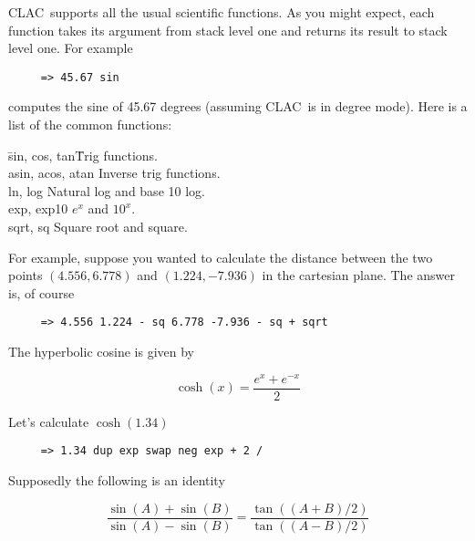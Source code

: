 \documentclass{report}
\newcommand{\CLAC}{CLAC}
\begin{document}
\CLAC\ supports all the usual scientific functions. As you might expect, each function takes its argument from stack level one and returns its result to stack level one. For example

\begin{verbatim}
     => 45.67 sin
\end{verbatim}

computes the sine of 45.67 degrees (assuming \CLAC\ is in degree mode). Here is a list of the common functions:

\begin{tabbing}

\hspace*{3em}\=sin, cos, tan\hspace{5em}\=Trig functions.\\
\>             asin, acos, atan\>         Inverse trig functions.\\
\>             ln, log\>                  Natural log and base 10 log.\\
\>             exp, exp10\>               $e^{x}$ and $10^{x}$.\\
\>             sqrt, sq\>                 Square root and square.\\

\end{tabbing}

For example, suppose you wanted to calculate the distance between the two points $(4.556, 6.778)$ and $(1.224, -7.936)$ in the cartesian plane. The answer is, of course

\begin{verbatim}
     => 4.556 1.224 - sq 6.778 -7.936 - sq + sqrt
\end{verbatim}

The hyperbolic cosine is given by

\begin{displaymath}
     \cosh (x) = \frac{ e^{x} + e^{-x} }{ 2 }
\end{displaymath}

Let's calculate $\cosh(1.34)$

\begin{verbatim}
     => 1.34 dup exp swap neg exp + 2 /
\end{verbatim}

Supposedly the following is an identity

\begin{displaymath}
     \frac { \sin(A) + \sin(B) }{ \sin(A) - \sin(B) } =
       \frac { \tan((A+B)/2) }{ \tan((A-B)/2) }
\end{displaymath}
\end{document}
